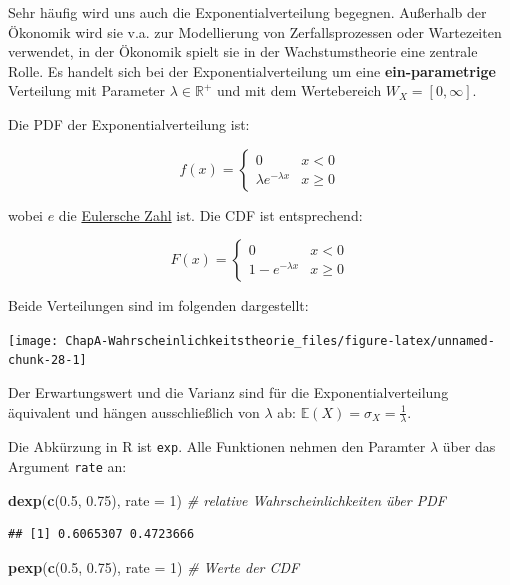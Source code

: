 \documentclass[]{book}
\newenvironment{Shaded}{\begin{snugshade}}{\end{snugshade}}
\newcommand{\KeywordTok}[1]{\textcolor[rgb]{0.13,0.29,0.53}{\textbf{#1}}}
\newcommand{\DataTypeTok}[1]{\textcolor[rgb]{0.13,0.29,0.53}{#1}}
\newcommand{\DecValTok}[1]{\textcolor[rgb]{0.00,0.00,0.81}{#1}}
\newcommand{\FloatTok}[1]{\textcolor[rgb]{0.00,0.00,0.81}{#1}}
\newcommand{\CommentTok}[1]{\textcolor[rgb]{0.56,0.35,0.01}{\textit{#1}}}
\newcommand{\NormalTok}[1]{#1}
\begin{document}
Sehr häufig wird uns auch die Exponentialverteilung begegnen. Außerhalb
der Ökonomik wird sie v.a. zur Modellierung von Zerfallsprozessen oder
Wartezeiten verwendet, in der Ökonomik spielt sie in der
Wachstumstheorie eine zentrale Rolle. Es handelt sich bei der
Exponentialverteilung um eine \textbf{ein-parametrige} Verteilung mit
Parameter \(\lambda \in \mathbb{R}^+\) und mit dem Wertebereich
\(W_X=[0, \infty ]\).

Die PDF der Exponentialverteilung ist:

\[f(x)=\begin{cases}
0 & x < 0\\
\lambda e^{-\lambda x} & x \geq 0
\end{cases}\]

wobei \(e\) die
\href{https://de.wikipedia.org/wiki/Eulersche_Zahl}{Eulersche Zahl} ist.
Die CDF ist entsprechend:

\[F(x)=\begin{cases}
0 & x < 0\\
1-e^{-\lambda x} & x \geq 0
\end{cases}\]

Beide Verteilungen sind im folgenden dargestellt:

\begin{center}\texttt{[image: ChapA-Wahrscheinlichkeitstheorie\_files/figure-latex/unnamed-chunk-28-1]} \end{center}

Der Erwartungswert und die Varianz sind für die Exponentialverteilung
äquivalent und hängen ausschließlich von \(\lambda\) ab:
\(\mathbb{E}(X)=\sigma_X=\frac{1}{\lambda}\).

Die Abkürzung in R ist \texttt{exp}. Alle Funktionen nehmen den Paramter
\(\lambda\) über das Argument \texttt{rate} an:

\begin{Shaded}
\begin{Highlighting}[]
\KeywordTok{dexp}\NormalTok{(}\KeywordTok{c}\NormalTok{(}\FloatTok{0.5}\NormalTok{, }\FloatTok{0.75}\NormalTok{), }\DataTypeTok{rate =} \DecValTok{1}\NormalTok{) }\CommentTok{# relative Wahrscheinlichkeiten über PDF}
\end{Highlighting}
\end{Shaded}

\begin{verbatim}
## [1] 0.6065307 0.4723666
\end{verbatim}

\begin{Shaded}
\begin{Highlighting}[]
\KeywordTok{pexp}\NormalTok{(}\KeywordTok{c}\NormalTok{(}\FloatTok{0.5}\NormalTok{, }\FloatTok{0.75}\NormalTok{), }\DataTypeTok{rate =} \DecValTok{1}\NormalTok{) }\CommentTok{# Werte der CDF}
\end{Highlighting}
\end{Shaded}
\end{document}
